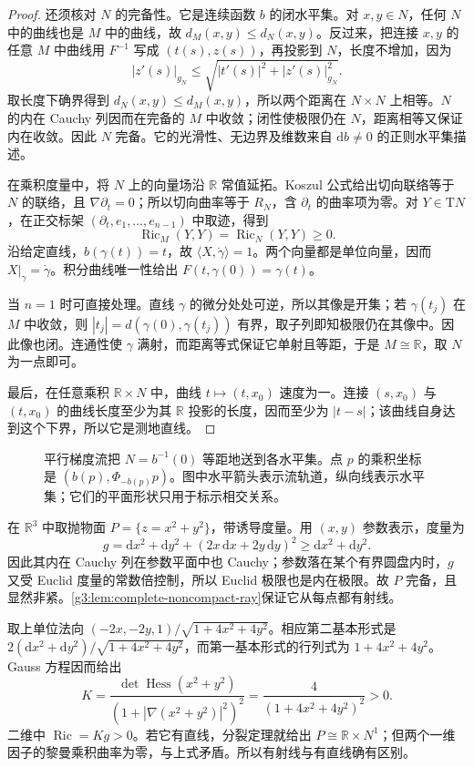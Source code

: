\begin{proof}
	还须核对 \(N\) 的完备性。它是连续函数 \(b\) 的闭水平集。对 \(x,y\in N\)，任何 \(N\) 中的曲线也是 \(M\) 中的曲线，故 \(d_M(x,y)\le d_N(x,y)\)。反过来，把连接 \(x,y\) 的任意 \(M\) 中曲线用 \(F^{-1}\) 写成 \((t(s),z(s))\)，再投影到 \(N\)，长度不增加，因为
	\[
		|z'(s)|_{g_N}\le\sqrt{|t'(s)|^2+|z'(s)|_{g_N}^2}.
	\]
	取长度下确界得到 \(d_N(x,y)\le d_M(x,y)\)，所以两个距离在 \(N\times N\) 上相等。\(N\) 的内在 Cauchy 列因而在完备的 \(M\) 中收敛；闭性使极限仍在 \(N\)，距离相等又保证内在收敛。因此 \(N\) 完备。它的光滑性、无边界及维数来自 \(\mathrm db\ne0\) 的正则水平集描述。

	在乘积度量中，将 \(N\) 上的向量场沿 \(\mathbb R\) 常值延拓。Koszul 公式给出切向联络等于 \(N\) 的联络，且 \(\nabla\partial_t=0\)；所以切向曲率等于 \(R_N\)，含 \(\partial_t\) 的曲率项为零。对 \(Y\in\mathrm TN\)，在正交标架 \((\partial_t,e_1,\ldots,e_{n-1})\) 中取迹，得到
	\[
		\operatorname{Ric}_M(Y,Y)=\operatorname{Ric}_N(Y,Y)\ge0.
	\]
	沿给定直线，\(b(\gamma(t))=t\)，故
	\(\langle X,\dot\gamma\rangle=1\)。两个向量都是单位向量，因而 \(X|_\gamma=\dot\gamma\)。积分曲线唯一性给出 \(F(t,\gamma(0))=\gamma(t)\)。

	当 \(n=1\) 时可直接处理。直线 \(\gamma\) 的微分处处可逆，所以其像是开集；若 \(\gamma(t_j)\) 在 \(M\) 中收敛，则 \(|t_j|=d(\gamma(0),\gamma(t_j))\) 有界，取子列即知极限仍在其像中。因此像也闭。连通性使 \(\gamma\) 满射，而距离等式保证它单射且等距，于是 \(M\cong\mathbb R\)，取 \(N\) 为一点即可。

	最后，在任意乘积 \(\mathbb R\times N\) 中，曲线 \(t\mapsto(t,x_0)\) 速度为一。连接 \((s,x_0)\) 与 \((t,x_0)\) 的曲线长度至少为其 \(\mathbb R\) 投影的长度，因而至少为 \(|t-s|\)；该曲线自身达到这个下界，所以它是测地直线。
\end{proof}

\begin{figure}[htbp]
	\centering
	
	\caption[平行梯度流与水平集乘积]{平行梯度流把 \(N=b^{-1}(0)\) 等距地送到各水平集。点 \(p\) 的乘积坐标是 \((b(p),\Phi_{-b(p)}p)\)。图中水平箭头表示流轨道，纵向线表示水平集；它们的平面形状只用于标示相交关系。}
	\label{g3:fig:splitting-flow}
\end{figure}

\begin{example}\label{g3:exm:ray-without-line-paraboloid}
	在 \(\mathbb R^3\) 中取抛物面 \(P=\{z=x^2+y^2\}\)，带诱导度量。用 \((x,y)\) 参数表示，度量为
	\[
		g=\mathrm dx^2+\mathrm dy^2+(2x\,\mathrm dx+2y\,\mathrm dy)^2
		\ge\mathrm dx^2+\mathrm dy^2.
	\]
	因此其内在 Cauchy 列在参数平面中也 Cauchy；参数落在某个有界圆盘内时，\(g\) 又受 Euclid 度量的常数倍控制，所以 Euclid 极限也是内在极限。故 \(P\) 完备，且显然非紧。\cref{g3:lem:complete-noncompact-ray}保证它从每点都有射线。

	取上单位法向 \((-2x,-2y,1)/\sqrt{1+4x^2+4y^2}\)。相应第二基本形式是 \(2(\mathrm dx^2+\mathrm dy^2)/\sqrt{1+4x^2+4y^2}\)，而第一基本形式的行列式为 \(1+4x^2+4y^2\)。Gauss 方程因而给出
	\[
		K=\frac{\det\operatorname{Hess}(x^2+y^2)}
		{(1+|\nabla(x^2+y^2)|^2)^2}
		=\frac4{(1+4x^2+4y^2)^2}>0.
	\]
	二维中 \(\operatorname{Ric}=Kg>0\)。若它有直线，分裂定理就给出 \(P\cong\mathbb R\times N^1\)；但两个一维因子的黎曼乘积曲率为零，与上式矛盾。所以有射线与有直线确有区别。
\end{example}

